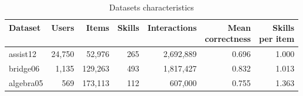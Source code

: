 \begin{table}
\centering
\begin{tabular}{@{}lrrrrrr@{}}
\toprule
Dataset & Users & Items & Skills & Interactions & \makecell[cl]{Mean \\ correctness} & 
\makecell[cl]{Skills \\ per item} \\
\midrule
assist12 & 24,750 & 52,976 & 265 & 2,692,889 & 0.696 & 1.000 \\
bridge06 & 1,135 & 129,263 & 493 & 1,817,427 & 0.832 & 1.013 \\
algebra05 & 569 & 173,113 & 112 & 607,000 & 0.755 & 1.363 \\
\bottomrule
\end{tabular}
\caption{Datasets characteristics}
\label{data_caracs}
\end{table}